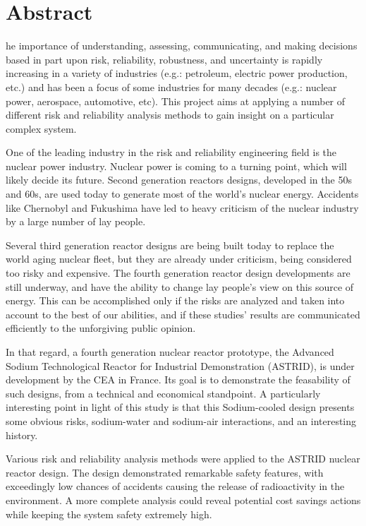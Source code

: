 \chapter*{Abstract}
\begin{SingleSpace}
he importance of understanding, assessing, communicating, and making decisions based in part upon risk, reliability, robustness, and uncertainty is rapidly increasing in a variety of industries (e.g.: petroleum, electric power production, etc.) and has been a focus of some industries for many decades (e.g.: nuclear power, aerospace, automotive, etc). This project aims at applying a number of different risk and reliability analysis methods to gain insight on a particular complex system.

One of the leading industry in the risk and reliability engineering field is the nuclear power industry. Nuclear power is coming to a turning point, which will likely decide its future. Second generation reactors designs, developed in the 50s and 60s, are used today to generate most of the world's nuclear energy. Accidents like Chernobyl and Fukushima have led to heavy criticism of the nuclear industry by a large number of lay people.

Several third generation reactor designs are being built today to replace the world aging nuclear fleet, but they are already under criticism, being considered too risky and expensive. The fourth generation reactor design developments are still underway, and have the ability to change lay people's view on this source of energy. This can be accomplished only if the risks are analyzed and taken into account to the best of our abilities, and if these studies' results are communicated efficiently to the unforgiving public opinion.

In that regard, a fourth generation nuclear reactor prototype, the Advanced Sodium Technological Reactor for Industrial Demonstration (ASTRID), is under development by the CEA in France. Its goal is to demonstrate the feasability of such designs, from a technical and economical standpoint. A particularly interesting point in light of this study is that this Sodium-cooled design presents some obvious risks, sodium-water and sodium-air interactions, and an interesting history.

Various risk and reliability analysis methods were applied to the ASTRID nuclear reactor design. The design demonstrated remarkable safety features, with exceedingly low chances of accidents causing the release of radioactivity in the environment. A more complete analysis could reveal potential cost savings actions while keeping the system safety extremely high.


\end{SingleSpace}
